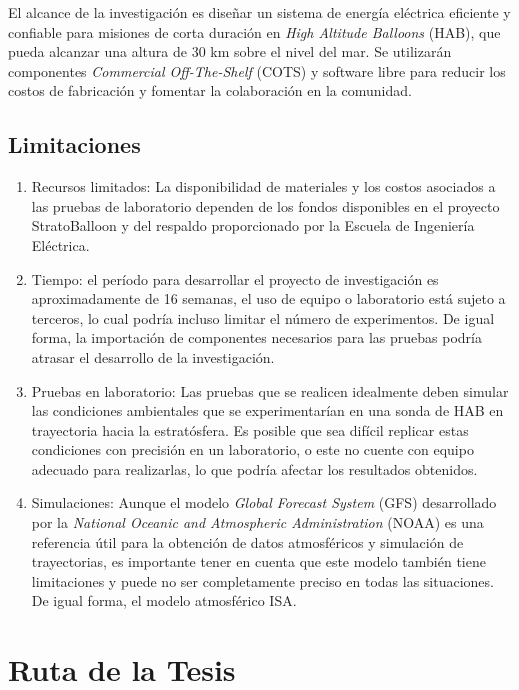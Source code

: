 El alcance de la investigación es diseñar un sistema de energía eléctrica eficiente y confiable para misiones de corta duración en \emph{High Altitude Balloons} (HAB), que pueda alcanzar una altura de 30 km sobre el nivel del mar. Se utilizarán componentes \emph{Commercial Off-The-Shelf}  (COTS) y software libre para reducir los costos de fabricación y fomentar la colaboración en la comunidad. 

\subsection{Limitaciones}
\begin{enumerate}
    \item Recursos limitados: La disponibilidad de materiales y los costos asociados a las pruebas de laboratorio dependen de los fondos disponibles en el proyecto StratoBalloon y del respaldo proporcionado por la Escuela de Ingeniería Eléctrica.

    \item Tiempo: el período para desarrollar el proyecto de investigación es aproximadamente de 16 semanas, el uso de equipo o laboratorio está sujeto a terceros, lo cual podría incluso limitar el número de experimentos. De igual forma, la importación de componentes necesarios para las pruebas podría atrasar el desarrollo de la investigación.

    \item Pruebas en laboratorio: Las pruebas que se realicen idealmente deben simular las condiciones ambientales que se experimentarían en una sonda de HAB en trayectoria hacia la estratósfera. Es posible que sea difícil replicar estas condiciones con precisión en un laboratorio, o este no cuente con equipo adecuado para realizarlas, lo que podría afectar los resultados obtenidos.

    \item Simulaciones: Aunque el modelo \emph{Global Forecast System} (GFS) desarrollado por la \emph{National Oceanic and Atmospheric Administration} (NOAA) es una referencia útil para la obtención de datos atmosféricos y simulación de trayectorias, es importante tener en cuenta que este modelo también tiene limitaciones y puede no ser completamente preciso en todas las situaciones. De igual forma, el modelo atmosférico ISA.
\end{enumerate}


\newpage


\section{Ruta de la Tesis}

